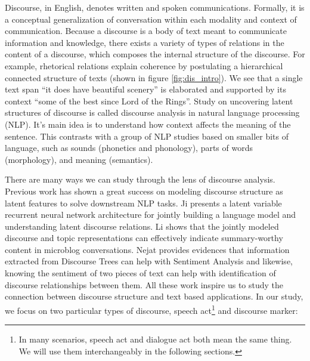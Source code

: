Discourse, in English, denotes written and spoken communications. Formally, it is a conceptual generalization of conversation within each modality and context of communication.  Because a discourse is a body of text meant to communicate information and knowledge, there exists a variety of types of relations in the content of a discourse, which composes the internal structure of the discourse. For example, rhetorical relations explain coherence by postulating a hierarchical connected structure of texts (shown in figure \ref{fig:dis_intro}). We see that a single text span ``it does have beautiful scenery'' is elaborated and supported by its context ``some of the best since Lord of the Rings''. Study on uncovering latent structures of discourse is called discourse analysis in natural language processing (NLP). It's main idea is to understand how context affects the meaning of the sentence. This contrasts with a group of NLP studies based on smaller bits of language, such as sounds (phonetics and phonology), parts of words (morphology), and meaning (semantics).  %

 
There are many ways we can study through the lens of discourse analysis. Previous work has shown a great success on modeling discourse structure as latent features to solve downstream NLP tasks. Ji \cite{ji2016latent2} presents a latent variable recurrent neural network architecture for jointly building a language model and understanding latent discourse relations. Li \cite{li2018joint} shows that the jointly modeled discourse and topic representations can effectively indicate summary-worthy content in microblog conversations. Nejat \cite{nejat2017exploring} provides evidences that information extracted from Discourse Trees can help with Sentiment Analysis and likewise, knowing the sentiment of two pieces of text can help with identification of discourse relationships between them. All these work inspire us to study the connection between discourse structure and text based applications. In our study, we focus on two particular types of discourse, speech act\footnote{In many scenarios, speech act and dialogue act both mean the same thing. We will use them interchangeably in the following sections.} and discourse marker:

